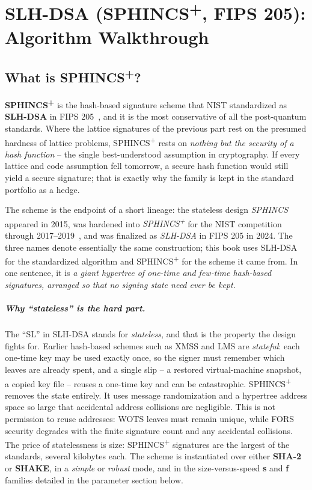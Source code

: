 \chapter{SLH-DSA (SPHINCS\textsuperscript{+}, FIPS 205): Algorithm Walkthrough}
\label{ch:slhdsa}

\section{What is SPHINCS\textsuperscript{+}?}

\textbf{SPHINCS\textsuperscript{+}} is the hash-based signature scheme that NIST standardized as \textbf{SLH-DSA} in FIPS 205~\cite{fips205,sphincsplus2019}, and it is the most conservative of all the post-quantum standards. Where the lattice signatures of the previous part rest on the presumed hardness of lattice problems, SPHINCS\textsuperscript{+} rests on \emph{nothing but the security of a hash function} -- the single best-understood assumption in cryptography. If every lattice and code assumption fell tomorrow, a secure hash function would still yield a secure signature; that is exactly why the family is kept in the standard portfolio as a hedge.

The scheme is the endpoint of a short lineage: the stateless design \emph{SPHINCS} appeared in 2015, was hardened into \emph{SPHINCS\textsuperscript{+}} for the NIST competition through 2017--2019~\cite{sphincsplus2019}, and was finalized as \emph{SLH-DSA} in FIPS 205 in 2024. The three names denote essentially the same construction; this book uses SLH-DSA for the standardized algorithm and SPHINCS\textsuperscript{+} for the scheme it came from. In one sentence, it is \emph{a giant hypertree of one-time and few-time hash-based signatures, arranged so that no signing state need ever be kept}.

\paragraph{Why ``stateless'' is the hard part.}
The ``SL'' in SLH-DSA stands for \emph{stateless}, and that is the property the design fights for. Earlier hash-based schemes such as XMSS and LMS are \emph{stateful}: each one-time key may be used exactly once, so the signer must remember which leaves are already spent, and a single slip -- a restored virtual-machine snapshot, a copied key file -- reuses a one-time key and can be catastrophic. SPHINCS\textsuperscript{+} removes the state entirely. It uses message randomization and a hypertree address space so large that accidental address collisions are negligible. This is not permission to reuse addresses: WOTS leaves must remain unique, while FORS security degrades with the finite signature count and any accidental collisions. The price of statelessness is size: SPHINCS\textsuperscript{+} signatures are the largest of the standards, several kilobytes each. The scheme is instantiated over either \textbf{SHA-2} or \textbf{SHAKE}, in a \emph{simple} or \emph{robust} mode, and in the size-versus-speed \textbf{s} and \textbf{f} families detailed in the parameter section below.

